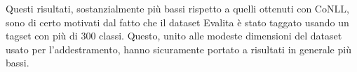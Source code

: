 Questi risultati, sostanzialmente pi\`u bassi rispetto a quelli ottenuti con CoNLL,
sono di certo motivati dal fatto che il dataset Evalita \`e stato taggato usando
un tagset con pi\`u di 300 classi. Questo, unito alle modeste dimensioni del dataset
usato per l'addestramento, hanno sicuramente portato a risultati in generale pi\`u
bassi.
